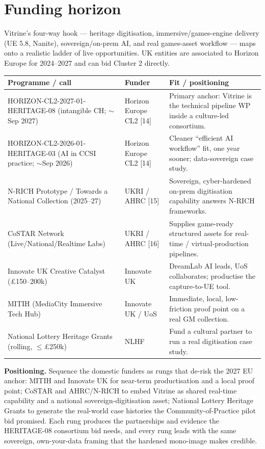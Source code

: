 \documentclass[a4paper,11pt]{article}
\begin{document}
\section{Funding horizon}

Vitrine's four-way hook --- heritage digitisation, immersive/games-engine delivery (UE 5.8,
Nanite), sovereign/on-prem AI, and real games-asset workflow --- maps onto a realistic ladder
of live opportunities. UK entities are associated to Horizon Europe for 2024--2027 and can bid
Cluster 2 directly.

\begin{center}\small
\begin{tabularx}{\textwidth}{@{}L{5.4cm} L{3.0cm} X@{}}
\toprule
\textbf{Programme / call} & \textbf{Funder} & \textbf{Fit / positioning} \\
\midrule
HORIZON-CL2-2027-01-HERITAGE-08 (intangible CH; $\sim$Sep 2027) & Horizon Europe CL2 [14] & Primary anchor: Vitrine is the technical pipeline WP inside a culture-led consortium. \\
HORIZON-CL2-2026-01-HERITAGE-03 (AI in CCSI practice; $\sim$Sep 2026) & Horizon Europe CL2 [14] & Cleaner ``efficient AI workflow'' fit, one year sooner; data-sovereign case study. \\
N-RICH Prototype / Towards a National Collection (2025--27) & UKRI / AHRC [15] & Sovereign, cyber-hardened on-prem digitisation capability answers N-RICH frameworks. \\
CoSTAR Network (Live/National/Realtime Labs) & UKRI / AHRC [16] & Supplies game-ready structured assets for real-time / virtual-production pipelines. \\
Innovate UK Creative Catalyst (\pounds150--200k) & Innovate UK & DreamLab AI leads, UoS collaborates; productise the capture-to-UE tool. \\
MITIH (MediaCity Immersive Tech Hub) & Innovate UK / UoS & Immediate, local, low-friction proof point on a real GM collection. \\
National Lottery Heritage Grants (rolling, $\le$\pounds250k) & NLHF & Fund a cultural partner to run a real digitisation case study. \\
\bottomrule
\end{tabularx}
\end{center}

\textbf{Positioning.} Sequence the domestic funders as rungs that de-risk the 2027 EU anchor:
MITIH and Innovate UK for near-term productisation and a local proof point; CoSTAR and AHRC/N-RICH
to embed Vitrine as shared real-time capability and a national sovereign-digitisation asset;
National Lottery Heritage Grants to generate the real-world case histories the Community-of-Practice
pilot bid promised. Each rung produces the partnerships and evidence the HERITAGE-08 consortium bid
needs, and every rung leads with the same sovereign, own-your-data framing that the hardened
mono-image makes credible.
\end{document}
